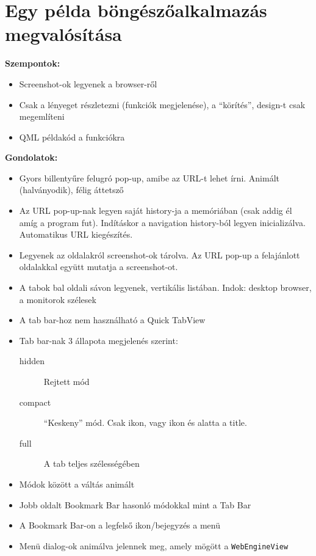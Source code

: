 \documentclass[12pt]{report}
\begin{document}
\pagebreak


\chapter{Egy példa böngészőalkalmazás megvalósítása}
\textbf{Szempontok:}
\begin{itemize}
    \item Screenshot-ok legyenek a browser-ről
    \item Csak a lényeget részletezni (funkciók megjelenése), a ``körítés'', design-t csak
        megemlíteni
    \item QML példakód a funkciókra
\end{itemize}

\noindent
\textbf{Gondolatok:}
\begin{itemize}
    \item Gyors billentyűre felugró pop-up, amibe az URL-t lehet írni. Animált (halványodik),
        félig áttetsző
    \item Az URL pop-up-nak legyen saját history-ja a memóriában (csak addig él amíg a
        program fut). Indításkor a navigation history-ból legyen inicializálva.
        Automatikus URL kiegészítés.
    \item Legyenek az oldalakról screenshot-ok tárolva. Az URL pop-up a felajánlott oldalakkal
        együtt mutatja a screenshot-ot.
    \item A tabok bal oldali sávon legyenek, vertikális listában. Indok: desktop browser,
        a monitorok szélesek
    \item A tab bar-hoz nem használható a Quick TabView
    \item Tab bar-nak 3 állapota megjelenés szerint:
        \begin{description}
            \item[hidden] Rejtett mód
            \item[compact] ``Keskeny'' mód. Csak ikon, vagy ikon és alatta a title.
            \item[full] A tab teljes szélességében
        \end{description}
    \item Módok között a váltás animált
    \item Jobb oldalt Bookmark Bar hasonló módokkal mint a Tab Bar
    \item A Bookmark Bar-on a legfelső ikon/bejegyzés a menü
    \item Menü dialog-ok animálva jelennek meg, amely mögött a \texttt{WebEngineView}

\end{itemize}
\end{document}
